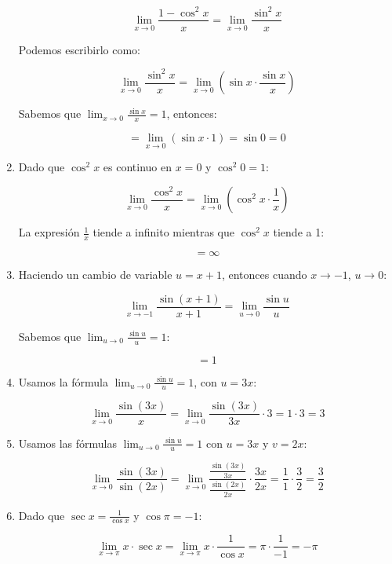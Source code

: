 \documentclass[answers]{exam} %
\begin{document}
\begin{questions}
\begin{solution}
\begin{enumerate}[label=\alph*.]
			\[
			\lim_{x\to{0}} \frac{1-\cos^2 x}{x} = \lim_{x\to{0}} \frac{\sin^2 x}{x}
			\]
	
			Podemos escribirlo como:
	
			\[
			\lim_{x\to{0}} \frac{\sin^2 x}{x} = \lim_{x\to{0}} \left(\sin x \cdot \frac{\sin x}{x}\right)
			\]
	
			Sabemos que \(\lim_{x \to 0} \frac{\sin x}{x} = 1\), entonces:
	
			\[
			= \lim_{x\to{0}} (\sin x \cdot 1) = \sin 0 = 0
			\]
	
			\item Dado que \(\cos^2 x\) es continuo en \(x = 0\) y \(\cos^2 0 = 1\):
	
			\[
			\lim_{x\to{0}} \frac{\cos^2 x}{x} = \lim_{x\to{0}} \left(\cos^2 x \cdot \frac{1}{x}\right)
			\]
	
			La expresión \(\frac{1}{x}\) tiende a infinito mientras que \(\cos^2 x\) tiende a 1:
	
			\[
			= \infty
			\]
	
			\item Haciendo un cambio de variable \(u = x + 1\), entonces cuando \(x \to -1\), \(u \to 0\):
	
			\[
			\lim_{x\to{-1}} \frac{\sin(x+1)}{x+1} = \lim_{u\to{0}} \frac{\sin u}{u}
			\]
	
			Sabemos que \(\lim_{u \to 0} \frac{\sin u}{u} = 1\):
	
			\[
			= 1
			\]
	
			\item Usamos la fórmula \(\lim_{u \to 0} \frac{\sin u}{u} = 1\), con \(u = 3x\):
	
			\[
			\lim_{x\to{0}} \frac{\sin(3x)}{x} = \lim_{x\to{0}} \frac{\sin(3x)}{3x} \cdot 3 = 1 \cdot 3 = 3
			\]
	
			\item Usamos las fórmulas \(\lim_{u \to 0} \frac{\sin u}{u} = 1\) con \(u = 3x\) y \(v = 2x\):
	
			\[
			\lim_{x\to{0}} \frac{\sin(3x)}{\sin(2x)} = \lim_{x\to{0}} \frac{\frac{\sin(3x)}{3x}}{\frac{\sin(2x)}{2x}} \cdot \frac{3x}{2x} = \frac{1}{1} \cdot \frac{3}{2} = \frac{3}{2}
			\]
	
			\item Dado que \(\sec x = \frac{1}{\cos x}\) y \(\cos \pi = -1\):
	
			\[
			\lim_{x\to{\pi}} x \cdot \sec x = \lim_{x\to{\pi}} x \cdot \frac{1}{\cos x} = \pi \cdot \frac{1}{-1} = -\pi
			\]
	
		\end{enumerate}
	\end{solution}
	

	\vspace{0.5cm}

\end{questions}
\end{document}
